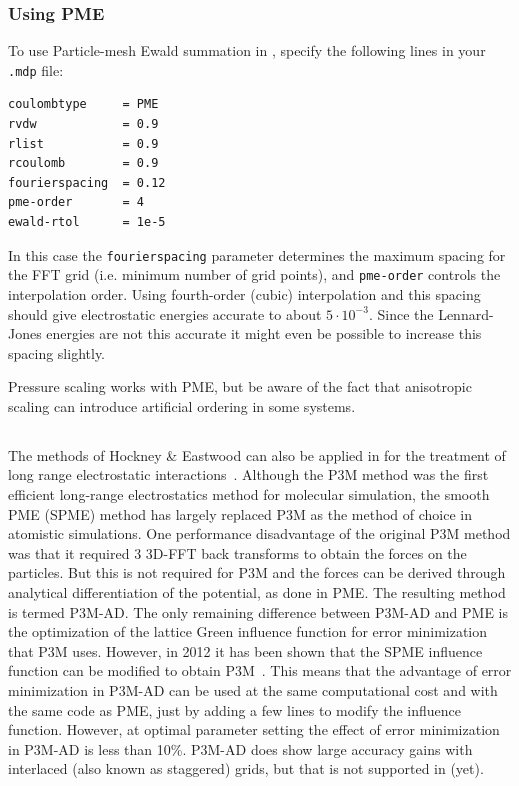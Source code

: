 \subsubsection{Using PME}
To use Particle-mesh Ewald summation in {\gromacs}, specify the
following lines in your {\tt .mdp} file:

\begin{verbatim}
coulombtype     = PME
rvdw            = 0.9
rlist           = 0.9
rcoulomb        = 0.9
fourierspacing  = 0.12
pme-order       = 4
ewald-rtol      = 1e-5
\end{verbatim}

In this case the {\tt fourierspacing} parameter determines the maximum
spacing for the FFT grid (i.e. minimum number of grid points),
and {\tt pme-order} controls the
interpolation order. Using fourth-order (cubic) interpolation and this
spacing should give electrostatic energies accurate to about
$5\cdot10^{-3}$. Since the Lennard-Jones energies are not this
accurate it might even be possible to increase this spacing slightly.

Pressure scaling works with PME, but be aware of the fact that
anisotropic scaling can introduce artificial ordering in some systems.

\subsection{}
\label{sec:pppm}
The  methods of
Hockney \& Eastwood can also be applied in {\gromacs} for the
treatment of long range electrostatic interactions~\cite{Hockney81}.
Although the P3M method was the first efficient long-range electrostatics
method for molecular simulation, the smooth PME (SPME) method has largely
replaced P3M as the method of choice in atomistic simulations. One performance
disadvantage of the original P3M method was that it required 3 3D-FFT
back transforms to obtain the forces on the particles. But this is not
required for P3M and the forces can be derived through analytical differentiation
of the potential, as done in PME. The resulting method is termed P3M-AD.
The only remaining difference between P3M-AD and PME is the optimization
of the lattice Green influence function for error minimization that P3M uses.
However, in 2012 it has been shown that the SPME influence function can be
modified to obtain P3M~\cite{Ballenegger2012}.
This means that the advantage of error minimization in P3M-AD can be used
at the same computational cost and with the same code as PME,
just by adding a few lines to modify the influence function.
However, at optimal parameter setting the effect of error minimization
in P3M-AD is less than 10\%. P3M-AD does show large accuracy gains with
interlaced (also known as staggered) grids, but that is not supported
in {\gromacs} (yet).

